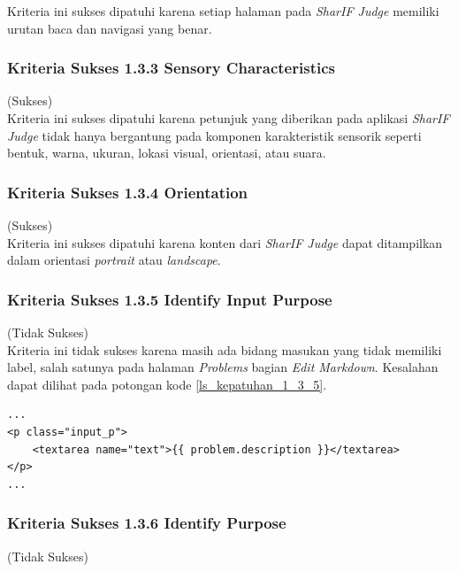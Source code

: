 \documentclass[a4paper,twoside]{article}
\begin{document}
\begin{enumerate}
		Kriteria ini sukses dipatuhi karena setiap halaman pada \textit{SharIF Judge} memiliki urutan baca dan navigasi yang benar.
		
		\subsubsection*{Kriteria Sukses 1.3.3 Sensory Characteristics}
		\label{subsubsec:kepatuhan_kriteria_1.3.3}
		(Sukses)\\
		
		Kriteria ini sukses dipatuhi karena petunjuk yang diberikan pada aplikasi \textit{SharIF Judge} tidak hanya bergantung pada komponen karakteristik sensorik seperti bentuk, warna, ukuran, lokasi visual, orientasi, atau suara.
		
		\subsubsection*{Kriteria Sukses 1.3.4 Orientation}
		\label{subsubsec:kepatuhan_kriteria_1.3.4}
		(Sukses) \\
		
		Kriteria ini sukses dipatuhi karena konten dari \textit{SharIF Judge} dapat ditampilkan dalam orientasi \textit{portrait} atau \textit{landscape}.
		
		\subsubsection*{Kriteria Sukses 1.3.5 Identify Input Purpose}
		\label{subsubsec:kepatuhan_kriteria_1.3.5}
		(Tidak Sukses)\\
		
		Kriteria ini tidak sukses karena masih ada bidang masukan yang tidak memiliki label, salah satunya pada halaman \textit{Problems} bagian \textit{Edit Markdown}. Kesalahan dapat dilihat pada potongan kode \ref{ls_kepatuhan_1_3_5}.
		\begin{lstlisting}[basicstyle=\ttfamily, frame=single,
		columns=fullflexible, keepspaces=true, breaklines=true, label=ls_kepatuhan_1_3_5, caption=Kriteria Sukses 1.3.5 - Elemen Tidak Diberi Label Pada Halaman \textit{Problems} Bagian \textit{Edit Markdown}]
...
<p class="input_p">
	<textarea name="text">{{ problem.description }}</textarea>
</p>
...
		\end{lstlisting}
		
		\subsubsection*{Kriteria Sukses 1.3.6 Identify Purpose}
		\label{subsubsec:kepatuhan_kriteria_1.3.6}
		(Tidak Sukses) \\
		

\end{enumerate}
\end{document}
